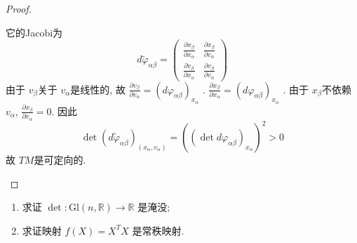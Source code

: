 \documentclass[../main.tex]{subfiles}
\begin{document}
\begin{proof}
\begin{enumerate}
\[      \]  它的Jacobi为 \[
    d  \tilde{\varphi} _{\alpha \beta }=   \begin{pmatrix} 
            \frac{\partial x_{\beta     }}{\partial x_{\alpha }}&\frac{\partial x_{\beta }}{\partial v_{\alpha }}\\ 
             \frac{\partial v_{\beta }}{\partial x_{\alpha }}& \frac{\partial v_{\beta }}{\partial v_{\alpha }}
      \end{pmatrix} 
      \]由于 \(  v_{\beta }  \)关于 \(  v_{\alpha }  \)是线性的, 故 \(  \frac{\partial v_{\beta }}{\partial v_{\alpha }}= \left( d \varphi _{\alpha \beta } \right)_{x_{\alpha }}   \) .  \(  \frac{\partial x_{\beta }}{\partial x_{\alpha }}=  \left( d \varphi _{\alpha \beta } \right)_{x_{\alpha }}   \)    . 由于 \(  x_{\beta }  \)不依赖 \(  v_{\alpha }  \),  \(  \frac{\partial x_{\beta }}{\partial v_{\alpha }}= 0  \). 因此 \[
      \det \left( d \tilde{\varphi} _{\alpha \beta } \right)_{\left( x_{\alpha },v_{\alpha } \right) }= \left( \left( \det d \varphi _{\alpha \beta } \right)  _{x_{\alpha }} \right) ^{2}> 0
      \]   故 \(  TM  \)是可定向的. 
    \end{enumerate}
    
\end{proof}
\begin{exercise}{}{}
\begin{enumerate}
    \item[a).] 求证 $\det: \mathrm{Gl}(n, \mathbb{R}) \to \mathbb{R}$ 是淹没;
    \item[b).] 求证映射 $f(X) = X^T X$ 是常秩映射.
\end{enumerate}
\end{exercise}
\end{document}
